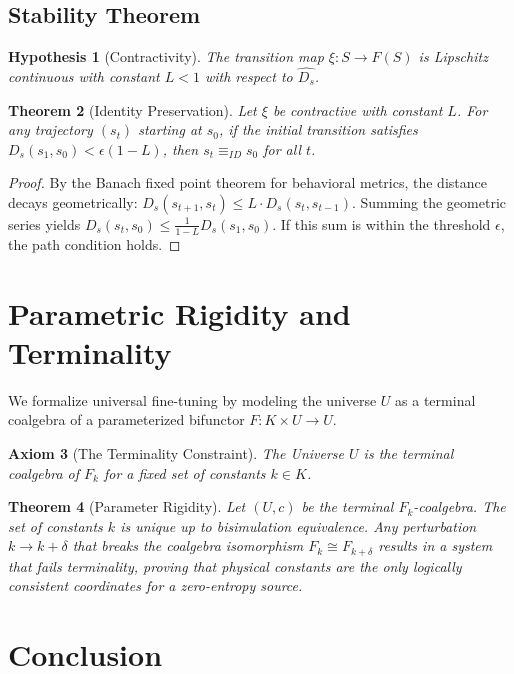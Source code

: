 \documentclass[11pt,a4paper]{article}
\newtheorem{theorem}{Theorem}[section]
\newtheorem{hypothesis}[theorem]{Hypothesis}
\newtheorem{axiom}[theorem]{Axiom}
\begin{document}
\subsection{Stability Theorem}
\begin{hypothesis}[Contractivity]
The transition map $\xi: S \to F(S)$ is Lipschitz continuous with constant $L < 1$ with respect to $\hat{D_s}$.
\end{hypothesis}

\begin{theorem}[Identity Preservation]
Let $\xi$ be contractive with constant $L$. For any trajectory $(s_t)$ starting at $s_0$, if the initial transition satisfies $D_s(s_1, s_0) < \epsilon(1-L)$, then $s_t \equiv_{ID} s_0$ for all $t$.
\end{theorem}
\begin{proof}
By the Banach fixed point theorem for behavioral metrics, the distance decays geometrically: $D_s(s_{t+1}, s_t) \leq L \cdot D_s(s_t, s_{t-1})$. Summing the geometric series yields $D_s(s_t, s_0) \leq \frac{1}{1-L} D_s(s_1, s_0)$. If this sum is within the threshold $\epsilon$, the path condition holds.
\end{proof}

\section{Parametric Rigidity and Terminality}

We formalize universal fine-tuning by modeling the universe $U$ as a terminal coalgebra of a parameterized bifunctor $F: K \times U \to U$.

\begin{axiom}[The Terminality Constraint]
The Universe $U$ is the terminal coalgebra of $F_k$ for a fixed set of constants $k \in K$.
\end{axiom}

\begin{theorem}[Parameter Rigidity]
Let $(U, c)$ be the terminal $F_k$-coalgebra. The set of constants $k$ is unique up to bisimulation equivalence. Any perturbation $k \to k + \delta$ that breaks the coalgebra isomorphism $F_k \cong F_{k+\delta}$ results in a system that fails terminality, proving that physical constants are the only logically consistent coordinates for a zero-entropy source.
\end{theorem}

\section{Conclusion}
\end{document}
